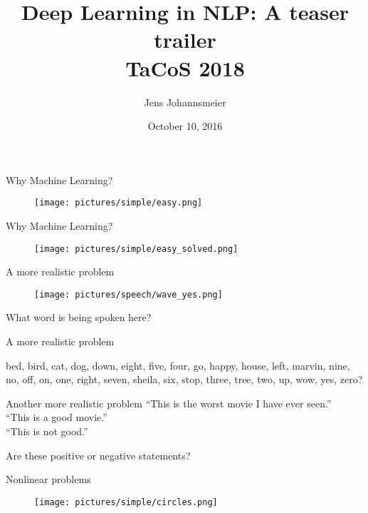\documentclass{beamer}
\title{Deep Learning in NLP: A teaser trailer\\ \small{TaCoS 2018}}
\author{Jens Johannsmeier}
\date{October 10, 2016}
\begin{document}
\begin{frame}
\titlepage
\end{frame}


\begin{frame}{Why Machine Learning?}
\begin{figure}
\texttt{[image: pictures/simple/easy.png]}
\end{figure}
\end{frame}


\begin{frame}{Why Machine Learning?}
\begin{figure}
\texttt{[image: pictures/simple/easy\_solved.png]}
\end{figure}
\end{frame}


\begin{frame}{A more realistic problem}
\begin{figure}
\texttt{[image: pictures/speech/wave\_yes.png]}
\end{figure}
What word is being spoken here?
\end{frame}


\begin{frame}{A more realistic problem}
\begin{figure}
\end{figure}
bed, bird, cat, dog, down, eight, five, four, go, happy, house, left, marvin, nine, no, off, on, one, right, seven, sheila, six, stop, three, tree, two, up, wow, yes, zero?
\end{frame}


\begin{frame}{Another more realistic problem}
``This is the worst movie I have ever seen.'' \\
``This is a good movie.'' \\
``This is not good.'' \bigskip

Are these positive or negative statements?
\end{frame}


\begin{frame}{Nonlinear problems}
\begin{figure}
\texttt{[image: pictures/simple/circles.png]}
\end{figure}
\end{frame}
\end{document}
